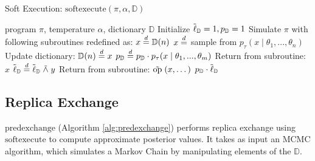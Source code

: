 \begin{algorithm}[tb]
  \caption{Soft Execution: $\textrm{softexecute}(\pi, \alpha, \mathbb{D})$}
  \label{alg:softexecute}
\begin{algorithmic}
 program $\pi$, temperature $\alpha$, dictionary $\mathbb{D}$
\STATE Initialize $\tilde{\operatorname{\ell}}_\mathbb{D} = 1, p_\mathbb{D} = 1$
\STATE Simulate $\pi$ with following subroutines redefined as:   
   \STATE $x \stackrel {d}{=} \mathbb{D}(n)$
 \ELSE
   \STATE $x \stackrel {d}{=} $ sample from $p_\tau(x \mid \theta_1, ..., \theta_n)$
   \STATE Update dictionary: $\mathbb{D}(n) \stackrel {d}{=} x$
 \ENDIF
 \STATE $p_\mathbb{D} \stackrel {d}{=} p_\mathbb{D} \cdot p_\tau(x \mid \theta_1, ..., \theta_m)$
 \STATE Return from subroutine: $x$
\ENDALOOP
\STATE
{}
  \STATE $\tilde{\operatorname{\ell}}_\mathbb{D} \stackrel {d}{=} \tilde{\operatorname{\ell}}_\mathbb{D} \mathrel{\tilde{\land}} y$
\ENDALOOP
\STATE
{}
  \STATE Return from subroutine: $\mathrel{\tilde{\textrm{op}}}(x, \dots)$ 
\ENDALOOP
\STATE
{} $p_\mathbb{D} \cdot \tilde{\operatorname{\ell}}_\mathbb{D}$
\end{algorithmic}
\end{algorithm}

\subsection{Replica Exchange}

$\textrm{predexchange}$ (Algorithm \ref{alg:predexchange}) performs replica exchange using $\textrm{softexecute}$ to compute approximate posterior values.
It takes as input an MCMC algorithm, which simulates a Markov Chain by manipulating elements of the $\mathbb{D}$.



